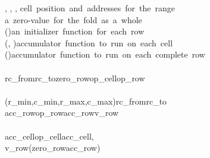 \begin{hscode}\SaveRestoreHook
{}%
%
%
%
%
%
%
%
\>[B]{}\mathbin{::}{}\<[15]%
\>[15]{}\llparenthesis \cdot , \cdot \rrparenthesis \to \llparenthesis \cdot , \cdot \rrparenthesis \to \llparenthesis \cdot , \cdot \rrparenthesis {}\<[40]%
\>[40]{}\mbox{\onelinecomment  cell position and addresses for the range}{}\<[E]%
\\
\>[15]{}\to {}\<[40]%
\>[40]{}\mbox{\onelinecomment  a zero-value for the fold as a whole}{}\<[E]%
\\
\>[15]{}\to (\to {}){}\<[40]%
\>[40]{}\mbox{\onelinecomment  an initializer function for each row}{}\<[E]%
\\
\>[15]{}\to (\to \llparenthesis \cdot , \cdot \rrparenthesis \to {}){}\<[40]%
\>[40]{}\mbox{\onelinecomment  accumulator function to run on each cell}{}\<[E]%
\\
\>[15]{}\to (\to {}\to {}\to {}){}\<[40]%
\>[40]{}\mbox{\onelinecomment  accumulator function to run on each complete row}{}\<[E]%
\\
\>[15]{}\to {}\<[E]%
\\
\>[B]{}\;\;rc_{from}\;rc_{to}\;\;zero_{row}\;op_{cell}\;op_{row}\mathrel{=}{}\<[E]%
\\
\>[B]{}\<[4]%
\>[4]{}\<[E]%
\\
\>[4]{}\<[7]%
\>[7]{}(r_{min},c_{min},r_{max},c_{max})\mathrel{=}\;\;rc_{from}\;rc_{to}{}\<[E]%
\\
\>[4]{}\<[7]%
\>[7]{}\;acc_{row}\;\mathrel{=}op_{row}\;acc_{row}\;\;v_{row}{}\<[E]%
\\
\>[7]{}\<[10]%
\>[10]{}\<[E]%
\\
\>[10]{}\<[13]%
\>[13]{}\;acc_{cell}\;\mathrel{=}op_{cell}\;acc_{cell}\;\llparenthesis \langle {}\rangle , \langle {}\rangle \rrparenthesis {}\<[E]%
\\
\>[10]{}\<[13]%
\>[13]{}v_{row}\mathrel{=}\;\;(zero_{row}\;acc_{row})\<[E]%
\\
\>[B]{}\<[4]%
\>[4]{}\<[E]%
\\
\>[4]{}\<[7]%
\>[7]{}\;\;\<[E]%
\ColumnHook
\end{hscode}\resethooks

